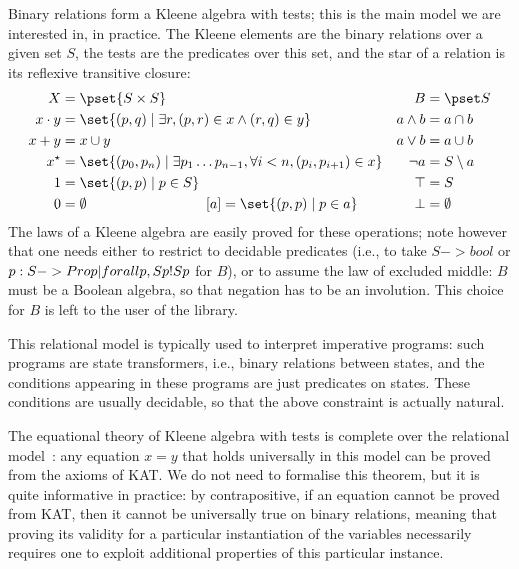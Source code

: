 \documentclass[a4paper]{llncs}
\begin{document}
Binary relations form a Kleene algebra with tests; this is the main
model we are interested in, in practice. The Kleene elements are the
binary relations over a given set $S$, the tests are the predicates
over this set, and the star of a relation is its reflexive transitive
closure:
\begin{align*}
  \begin{aligned}
    X &= \pset{S\times S}\\
    x\cdot y &= \set{(p,q)\mid \exists r, (p,r)\in x \land (r,q)\in y}\\
    x+y &= x\cup y\\
    x^\star &= 
    \set{(p_0,p_n)\mid \exists p_1\dots p_{n-1}, \forall i<n, (p_i,p_{i+1})\in x}\\
    1 &= \set{(p,p)\mid p\in S}\\
    0 &= \emptyset \hspace{3cm} [a] = \set{(p,p)\mid p\in a}
  \end{aligned}
  &&
  \begin{aligned}
    B &= \pset S\\
    a\land b &= a\cap b\\
    a\lor b &= a\cup b\\
    \neg a &= S\setminus a\\
    \top &= S\\
    \bot &= \emptyset
  \end{aligned}
\end{align*}
The laws of a Kleene algebra are easily proved for these operations;
note however that one needs either to restrict to decidable predicates
(i.e., to take \coqe$S -> bool$ or \coqe${p: S -> Prop | forall p, S p \/!S p}$ for $B$), or to assume
the law of excluded middle: $B$ must be a Boolean algebra, so that
negation has to be an involution. This choice for $B$ is left to the
user of the library.


This relational model is typically used to interpret imperative
programs: such programs are state transformers, i.e., binary relations
between states, and the conditions appearing in these programs are
just predicates on states. These conditions are usually decidable, so
that the above constraint is actually natural.


The equational theory of Kleene algebra with tests is complete over
the relational model~\cite{kozens96:kat:completeness:decidability}:
any equation $x=y$ that holds universally in this model can be proved
from the axioms of KAT. We do not need to formalise this theorem, but it is quite informative in
practice: by contrapositive, if an equation cannot be proved from KAT,
then it cannot be universally true on binary relations, meaning that
proving its validity for a particular instantiation of the variables
necessarily requires one to exploit additional properties of this
particular instance.
\end{document}
